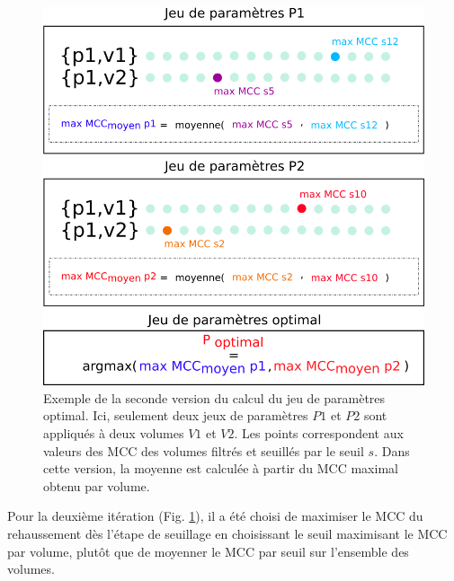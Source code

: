   \begin{figure}[!ht]
    \centering
    \includegraphics[width=\textwidth]{Images/optim_v2.png}
    \caption{Exemple de la seconde version du calcul du jeu de paramètres optimal. Ici, seulement deux jeux de paramètres $P1$ et $P2$ sont appliqués à deux volumes $V1$ et $V2$. Les points correspondent aux valeurs des MCC des volumes filtrés et seuillés par le seuil $s$. Dans cette version, la moyenne est calculée à partir du MCC maximal obtenu par volume.}
    \label{fig:optim_v2}
  \end{figure}

  Pour la deuxième itération (Fig. \ref{fig:optim_v2}), il a été choisi de maximiser le MCC du rehaussement dès l'étape de seuillage en choisissant le seuil maximisant le MCC par volume, plutôt que de moyenner le MCC par seuil sur l'ensemble des volumes. 

